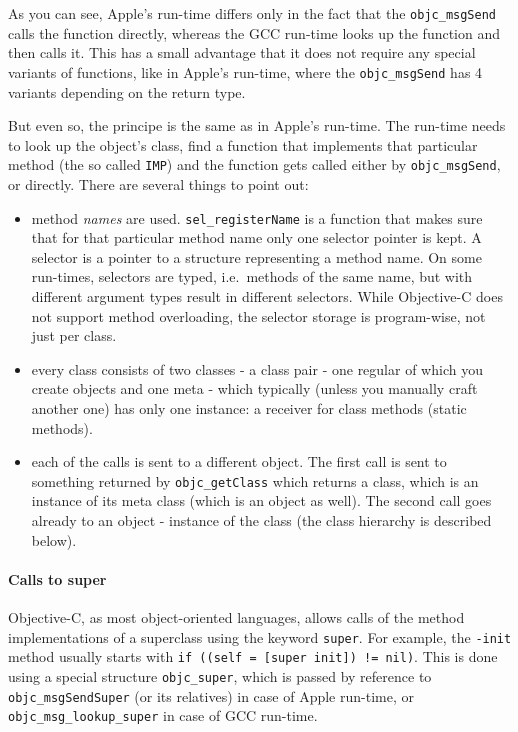 As you can see, Apple's run-time differs only in the fact that the \verb=objc_msgSend= calls the function directly, whereas the GCC run-time looks up the function and then calls it. This has a small advantage that it does not require any special variants of functions, like in Apple's run-time, where the \verb=objc_msgSend= has 4 variants depending on the return type.

\hspace{20pt}

But even so, the principe is the same as in Apple's run-time. The run-time needs to look up the object's class, find a function that implements that particular method (the so called \verb=IMP=) and the function gets called either by \verb=objc_msgSend=, or directly. There are several things to point out:

\begin{itemize}
\item method \emph{names} are used. \verb=sel_registerName= is a function that makes sure that for that particular method name only one selector pointer is kept. A selector is a pointer to a structure representing a method name. On some run-times, selectors are typed, i.e.\ methods of the same name, but with different argument types result in different selectors. While Objective-C does not support method overloading, the selector storage is program-wise, not just per class.
\item every class consists of two classes - a class pair - one regular of which you create objects and one meta - which typically (unless you manually craft another one) has only one instance: a receiver for class methods (static methods).
\item each of the calls is sent to a different object. The first call is sent to something returned by \verb=objc_getClass= which returns a class, which is an instance of its meta class (which is an object as well). The second call goes already to an object - instance of the class (the class hierarchy is described below).
\end{itemize}

\paragraph{Calls to super}

Objective-C, as most object-oriented languages, allows calls of the method implementations of a superclass using the keyword \verb=super=. For example, the \verb=-init= method usually starts with \verb#if ((self = [super init]) != nil)#. This is done using a special structure \verb=objc_super=, which is passed by reference to \verb=objc_msgSendSuper= (or its relatives) in case of Apple run-time, or \newline{}\verb=objc_msg_lookup_super= in case of GCC run-time.

